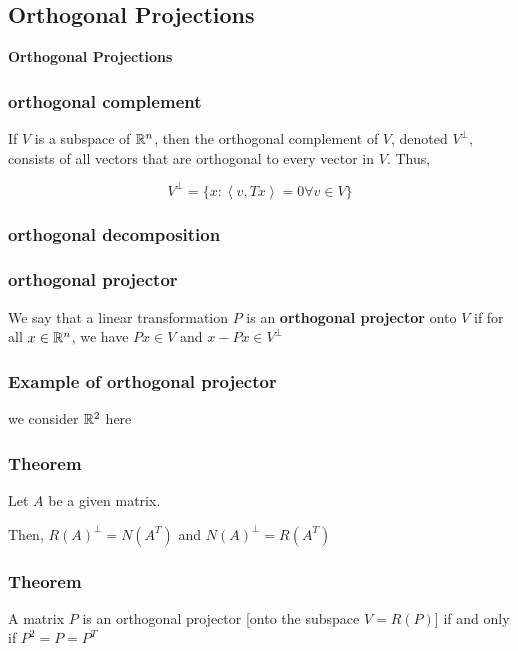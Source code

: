 


\begin{frame}
	\section{Orthogonal Projections}
	\begin{center}
	\textbf{Orthogonal Projections}
	\end{center}
\end{frame}

\begin{frame}

	\frametitle{orthogonal complement}
	If $V$ is a subspace of $\mathbb{R}^n$, then the orthogonal complement of $V$, denoted $V^{\perp}$, consists of all vectors that are orthogonal to every vector in $V$. Thus,

	$$V^{\perp} = \{x:\left<v,Tx\right>=0 \forall v\in V\}$$
\end{frame}

\begin{frame}
	\frametitle{orthogonal decomposition}
\end{frame}

\begin{frame}
	\frametitle{orthogonal projector}

	We say that a linear transformation $P$ is an \textbf{orthogonal projector} onto $V$ if for all $x \in \mathbb{R}^n$, we have $Px \in V$ and $x - Px \in V^{\perp}$
\end{frame}

\begin{frame}
	\frametitle{Example of orthogonal projector}

	we consider $\mathbb{R}^2$ here
\end{frame}

\begin{frame}
	\frametitle{Theorem}

	Let $A$ be a given matrix.

	Then, $R(A)^{\perp} = N(A^{T})$ and $N(A)^{\perp} = R(A^T)$
\end{frame}

\begin{frame}
	\frametitle{Theorem}
	A matrix $P$ is an orthogonal projector [onto the subspace $V = R(P)$] if and only if $P^2 = P = P^T$
\end{frame}

